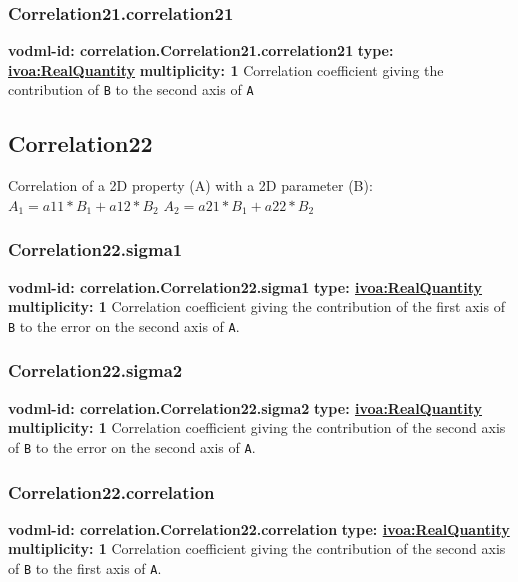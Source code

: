     \subsubsection{Correlation21.correlation21}
      \textbf{vodml-id: correlation.Correlation21.correlation21} \newline
      \textbf{type: \hyperref[sect:ivoa]{ivoa:RealQuantity}} \newline
      \textbf{multiplicity: 1} \newline 
      Correlation coefficient giving the contribution of \texttt{B} to the second axis of \texttt{A}

  \subsection{Correlation22}
  \label{sect:correlation.Correlation22}
    Correlation of a 2D property (A) with a 2D parameter (B): $A_1 = a11 * B_1 + a12 * B_2 $ $A_2 = a21 * B_1 + a22 * B_2 $

    \subsubsection{Correlation22.sigma1}
      \textbf{vodml-id: correlation.Correlation22.sigma1} \newline
      \textbf{type: \hyperref[sect:ivoa]{ivoa:RealQuantity}} \newline
      \textbf{multiplicity: 1} \newline 
      Correlation coefficient giving the contribution of the first axis of \texttt{B} to the error on the second axis of \texttt{A}.

    \subsubsection{Correlation22.sigma2}
      \textbf{vodml-id: correlation.Correlation22.sigma2} \newline
      \textbf{type: \hyperref[sect:ivoa]{ivoa:RealQuantity}} \newline
      \textbf{multiplicity: 1} \newline 
      Correlation coefficient giving the contribution of the second axis of \texttt{B} to the error on the second axis of \texttt{A}.

    \subsubsection{Correlation22.correlation}
      \textbf{vodml-id: correlation.Correlation22.correlation} \newline
      \textbf{type: \hyperref[sect:ivoa]{ivoa:RealQuantity}} \newline
      \textbf{multiplicity: 1} \newline 
      Correlation coefficient giving the contribution of the second axis of \texttt{B} to the first axis of \texttt{A}.

